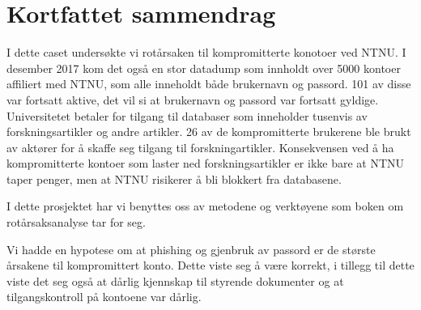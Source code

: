\chapter*{Kortfattet sammendrag}
I dette caset undersøkte vi rotårsaken til kompromitterte konotoer ved NTNU. I desember 2017 kom det også en stor datadump som innholdt over 5000 kontoer affiliert med NTNU, som alle inneholdt både brukernavn og passord. 101 av disse var fortsatt aktive, det vil si at brukernavn og passord var fortsatt gyldige. Universitetet betaler for tilgang til databaser som inneholder tusenvis av forskningsartikler og andre artikler. 26 av de kompromitterte brukerene ble brukt av aktører for å skaffe seg tilgang til forskningartikler. Konsekvensen ved å ha kompromitterte kontoer som laster ned forskningsartikler er ikke bare at NTNU taper penger, men at NTNU risikerer å bli blokkert fra databasene. 

I dette prosjektet har vi benyttes oss av metodene og verktøyene som boken om rotårsaksanalyse \cite{RCA} tar for seg.

Vi hadde en hypotese om at phishing og gjenbruk av passord er de største årsakene til kompromittert konto. Dette viste seg å være korrekt, i tillegg til dette viste det seg også at dårlig kjennskap til styrende dokumenter og at tilgangskontroll på kontoene var dårlig. 